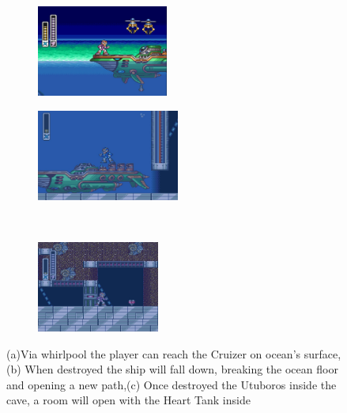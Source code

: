 \begin{figure}[htp]
	\centering
	\begin{subfigure}{0.4\textwidth}
		\centering
		\includegraphics[height=3cm]{figures/X1/Launch_octopus/Octopus_heart_1.jpg}
		\caption{}
	\end{subfigure}
	\begin{subfigure}{0.4\textwidth}
		\centering
		\includegraphics[height=3cm]{figures/X1/Launch_octopus/Octopus_heart_2.jpg}
		\caption{}
	\end{subfigure}\\
	\begin{subfigure}{0.4\textwidth}
		\centering
		\includegraphics[height=3cm]{figures/X1/Launch_octopus/Octopus_heart_3.jpg}
		\caption{}
	\end{subfigure}
	\caption{(a)Via whirlpool the player can reach the Cruizer on ocean's surface,(b) When destroyed the ship will fall down, breaking the ocean floor and opening a new path,(c) Once destroyed the Utuboros inside the cave, a room will open with the Heart Tank inside}
\end{figure}

